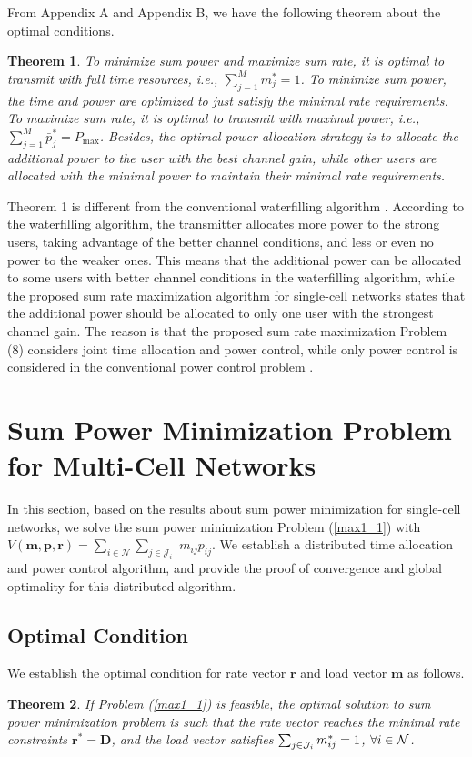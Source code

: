 \documentclass[journal]{IEEEtran}
\newtheorem{theorem}{Theorem}
\begin{document}
From Appendix A and Appendix B, we have the following theorem about the optimal conditions.
\begin{theorem}
To minimize sum power and maximize sum rate, it is optimal to transmit with full time resources, i.e., $\sum_{j=1}^M m_{j}^*=1$.
To minimize sum power, the time and power are optimized to just satisfy the minimal rate requirements.
To maximize sum rate, it is optimal to transmit with maximal power, i.e., $\sum_{j=1}^M \bar p_{j}^*=P_{\max}$.
Besides, the optimal power allocation strategy is to allocate
the additional power to the user with the best channel gain,
while other users are allocated with the minimal power to
maintain their minimal rate requirements.
\end{theorem}


Theorem 1 is different from the conventional waterfilling algorithm \cite[Section~5.3.3]{tse2006fundamentals}.
According to the waterfilling algorithm, the transmitter allocates more power to the strong users, taking advantage of the better channel conditions, and less or even no power to the weaker ones.
This means that the additional power can be allocated to some users with better channel conditions in the waterfilling algorithm, while the proposed sum rate maximization algorithm for single-cell networks states that the additional power should be allocated to only one user with the strongest channel gain.
The reason is that the proposed  sum rate maximization Problem (8) considers joint time allocation and power control, while only power control is considered in the conventional power control problem \cite[Section~5.3.3]{tse2006fundamentals}.



\section{Sum Power Minimization Problem for Multi-Cell Networks}
\label{section3}
In this section, based on the results about sum power minimization for single-cell networks, we solve the sum power minimization Problem (\ref{max1_1}) with $V(\pmb m, \pmb p, \pmb r)=\sum_{i \in \mathcal N} \sum_{j\in\mathcal J_i}$ $m_{ij}p_{ij}$.
We establish a distributed time allocation and power control algorithm, and provide the proof of convergence and global optimality for this distributed algorithm.

\subsection{Optimal Condition}
We establish the optimal condition for rate vector $\pmb r$ and load vector $\pmb m$ as follows.
\begin{theorem}\label{theoremopcmp}
If Problem (\ref{max1_1}) is feasible, the optimal solution to sum power minimization problem is such that the rate vector reaches the minimal rate constraints $\pmb r^*=\pmb D$, and the load vector satisfies $\sum_{j \in {\cal{J}}_i }m_{ij}^{*}=1$, $\forall i  \in {\cal{N}}$.
\end{theorem}
\end{document}
